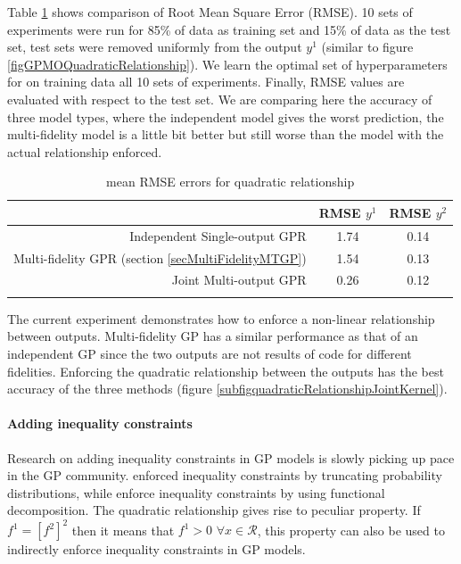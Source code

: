 Table \ref{table:rmseY1Y2} shows comparison of Root Mean Square Error (RMSE). 10 sets of experiments were run for 85\% of data as training set and 15\% of data as the test set, test sets were removed uniformly from the output $y^1$ (similar to figure \ref{figGPMOQuadraticRelationship}). We learn the optimal set of hyperparameters for on training data all 10 sets of experiments. Finally, RMSE values are evaluated with respect to the test set. We are comparing here the accuracy of three model types, where the independent model gives the worst prediction, the multi-fidelity model is a little bit better but still worse than the model with the actual relationship enforced. 

\begin{table}
\caption{mean RMSE errors for quadratic relationship}
\centering
\label{t:observed_psrs}
\begin{tabular}{rcc}
\noalign{\smallskip} \hline \hline \noalign{\smallskip}
 & RMSE \(y^{1}\) & RMSE \(y^{2}\) \\
\hline
Independent Single-output GPR & 1.74 & 0.14 \\
Multi-fidelity GPR (section \ref{secMultiFidelityMTGP})& 1.54 & 0.13 \\
Joint Multi-output GPR & 0.26 & 0.12 \\
\noalign{\smallskip} \hline \noalign{\smallskip}
\end{tabular}
\label{table:rmseY1Y2}
\end{table}

The current experiment demonstrates how to enforce a non-linear relationship between outputs. Multi-fidelity GP has a similar performance as that of an independent GP since the two outputs are not results of code for different fidelities. Enforcing the quadratic relationship between the outputs has the best accuracy of the three methods (figure \ref{subfigquadraticRelationshipJointKernel}). 

\paragraph{Adding inequality constraints}
Research on adding inequality constraints in GP models is slowly picking up pace in the GP community. \cite{da2012gaussian} enforced inequality constraints by truncating probability distributions, while \cite{maatouk2017gaussian} enforce inequality constraints by using functional decomposition. The quadratic relationship gives rise to peculiar property. If  $f^{1} = \left [f^{2} \right]^2$ then it means that $f^{1} > 0$ $\forall x \in \mathcal{R}$, this property can also be used to indirectly enforce inequality constraints in GP models. 

